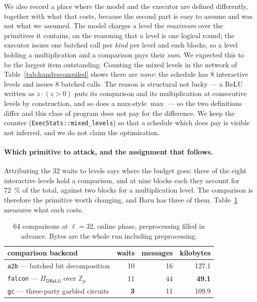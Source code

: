 \documentclass[11pt]{article}
\newcommand{\bt}[1]{\texttt{#1}}
\newcommand{\Z}{\mathbb{Z}}
\newcommand{\ReLU}{\ensuremath{\mathrm{ReLU}}}
\begin{document}
We also record a place where the model and the executor are defined differently, together with
what that costs, because the second part is easy to assume and was not what we assumed. The model
charges a level the \emph{maximum} over the primitives it contains, on the reasoning that a level
is one logical round; the executor issues one batched call per \emph{kind} per level and each
blocks, so a level holding a multiplication and a comparison pays their \emph{sum}. We expected
this to be the largest item outstanding. Counting the mixed levels in the network of
Table~\ref{tab:handvscompiled} shows there are \emph{none}: the schedule has \num{8} interactive
levels and issues \num{8} batched calls. The reason is structural not lucky --- a
$\ReLU$ written as $z \cdot (z > 0)$ puts its comparison and its multiplication at consecutive
levels by construction, and so does a mux-style $\max$ --- so the two definitions differ and this
class of program does not pay for the difference. We keep the counter (\bt{ExecStats::mixed\_levels})
so that a schedule which does pay is visible not inferred, and we do not claim the
optimisation.

\paragraph{Which primitive to attack, and the assignment that follows.}
Attributing the \num{32} waits to levels says where the budget goes: three of the eight
interactive levels hold a comparison, and at nine blocks each they account for \SI{72}{\percent}
of the total, against two blocks for a multiplication level. The comparison is therefore the
primitive worth changing, and Baru has three of them. Table~\ref{tab:cmpbackends} measures what
each costs.

\begin{table}[htb]
\centering
\small
\begin{tabular}{@{}lrrr@{}}
\toprule
comparison backend & waits & messages & kilobytes \\
\midrule
\bt{a2b} --- batched bit decomposition & \num{10} & \num{16} & 127.1 \\
\bt{falcon} --- $\Pi_{\mathsf{DReLU}}$ over $\Z_p$ & \num{11} & \num{44} & \textbf{49.1} \\
\bt{gc} --- three-party garbled circuits & \textbf{3} & \num{11} & 109.9 \\
\bottomrule
\end{tabular}
\caption{\num{64} comparisons at $\ell = 32$, online phase, preprocessing filled in advance.
Bytes are the whole run including preprocessing.}
\label{tab:cmpbackends}
\end{table}
\end{document}
